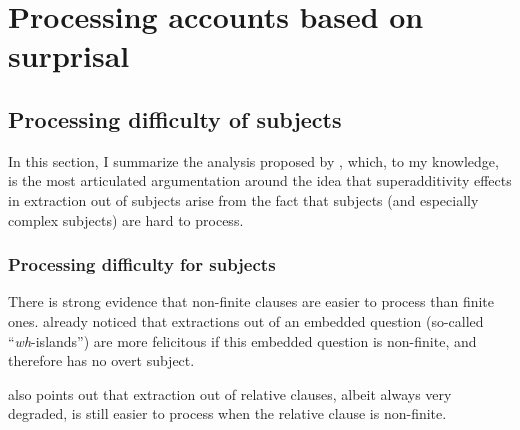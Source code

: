 \section{Processing accounts based on surprisal}

\subsection{Processing difficulty of subjects}
\label{ch:processing-kluender}

In this section, I summarize the analysis proposed by \citet{Kluender.2004}, which, to my knowledge, is the most articulated argumentation around the idea that superadditivity effects in extraction out of subjects arise from the fact that subjects (and especially complex subjects) are hard to process. 

\subsubsection{Processing difficulty for subjects} 

There is strong evidence that non-finite clauses are easier to process than finite ones. \citet[27]{Ross.1967} already noticed that extractions out of an embedded question (so-called ``\textit{wh}-islands'') are more felicitous if this embedded question is non-finite, and therefore has no overt subject. 

\begin{exe}
\ex \citep[27]{Ross.1967}
\begin{xlist}
\label{ex:surprisal-ross-whislands}
\end{xlist}
\end{exe}

\citet[106]{Kluender.2004} also points out that extraction out of relative clauses, albeit always very degraded, is still easier to process when the relative clause is non-finite.

\pagebreak
\begin{exe}
\ex \citep[106]{Kluender.2004}
\begin{xlist}
\label{ex:surprisal-kluender-rcislands}
\end{xlist}
\end{exe}

